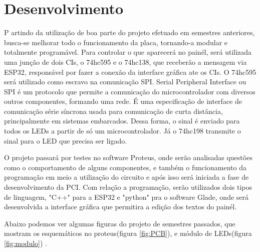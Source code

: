 \chapter{Desenvolvimento}


\lettrine[lines=3]{P}{} artindo da utilização de boa parte do projeto efetuado em semestres anteriores, busca-se melhorar todo o funcionamento da placa, tornando-a modular e totalmente programável. Para controlar o que aparecerá no painél, será utilizada uma junção de dois CIs, o 74hc595 e o 74hc138, que receberão a mensagem via ESP32, responsável por fazer a conexão da interface gráfica ate os CIs. O 74hc595 será utilizado como escravo na comunicação SPI. Serial Peripheral Interface ou SPI é um protocolo que permite a comunicação do microcontrolador com diversos outros componentes, formando uma rede. É uma especificação de interface de comunicação série síncrona usada para comunicação de curta distância, principalmente em sistemas embarcados. Dessa forma, o sinal é enviado para todos os LEDs a partir de só um microcontrolador. Já o 74hc198 transmite o sinal para o LED que precisa ser ligado. 

O projeto passará por testes no software Proteus, onde serão analisadas questões como o comportamento de alguns componentes, e também o funcionamento da programação em meio a utilização do circuito e após isso será iniciada a fase de desenvolvimento da PCI. Com relação a programação, serão utilizados dois tipos de linguagem, "C++" para a ESP32 e "python" pra o software Glade, onde será desenvolvida a interface gráfica que permitira a edição dos textos do painél.

Abaixo podemos ver algumas figuras do projeto de semestres passados, que mostram os esquemáticos no proteus(figura \ref{fig:PCB}), e módulo de LEDs(figura \ref{fig:modulo}) .


